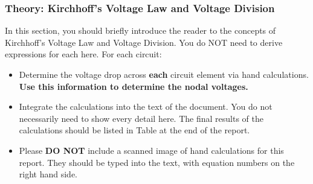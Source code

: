 \documentclass[11pt]{article}
\begin{document}
\subsubsection{Theory: Kirchhoff's Voltage Law and Voltage Division}
In this section, you should briefly introduce the reader to the concepts of Kirchhoff's Voltage Law and Voltage Division.  You do NOT need to derive expressions for each here. For each circuit:
\begin{itemize}
	\item Determine the voltage drop across \textbf{each} circuit element via hand calculations.  \textbf{Use this information to determine the nodal voltages.}
	\item Integrate the calculations into the text of the document. You do not necessarily need to show every detail here. The final results of the calculations should be listed in Table  at the end of the report.
	\item Please \textbf{DO NOT} include a scanned image of hand calculations for this report.  They should be typed into the text, with equation numbers on the right hand side. %
\end{itemize}
\end{document}
